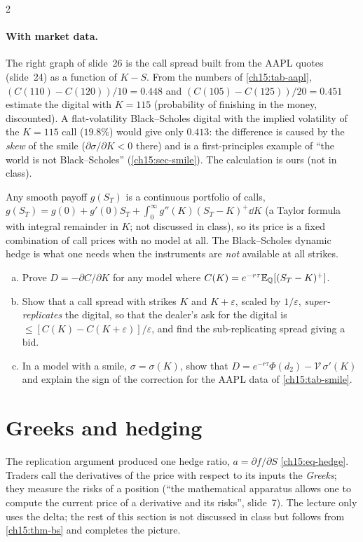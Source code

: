 \begin{paracol}{2}
\paragraph{With market data.} The right graph of slide~26 is the call spread built from the AAPL quotes (slide~24) as a function of $K-S$. From the numbers of \cref{ch15:tab-aapl}, $(C(110)-C(120))/10=0.448$
and $(C(105)-C(125))/20=0.451$ estimate the digital with $K=115$ (probability of finishing in the money, discounted). A flat-volatility Black--Scholes digital with the implied volatility of the $K=115$ call ($19.8\%$) would give only $0.413$: the
difference is caused by the \emph{skew} of the smile ($\partial\sigma/\partial K<0$ there) and is a first-principles example of ``the world is not Black--Scholes'' (\cref{ch15:sec-smile}). The calculation is ours (not in class).

\begin{intuition}
Any smooth payoff $g(S_T)$ is a continuous portfolio of calls, $g(S_T)=g(0)+g'(0)S_T+\int_0^\infty g''(K)(S_T-K)^+\dd K$ (a Taylor formula with integral remainder in $K$; not discussed in class), so its price
is a fixed combination of call prices with no model at all. The Black--Scholes dynamic hedge is what one needs when the instruments are \emph{not} available at all strikes.
\end{intuition}

\begin{exercise}\label{ch15:ex-digital}
\leavevmode
\begin{enumerate}[(a)]
  \item Prove $D=-\partial C/\partial K$ for any model where $C(K)=e^{-r\tau}\mathbb{E}_{\mathbb{Q}}[(S_T-K)^+]$.
  \item Show that a call spread with strikes $K$ and $K+\varepsilon$, scaled by $1/\varepsilon$, \emph{super-replicates} the digital,
      so that the dealer's ask for the digital is $\le[C(K)-C(K+\varepsilon)]/\varepsilon$, and find the sub-replicating spread giving a bid.
  \item In a model with a smile, $\sigma=\sigma(K)$, show that $D=e^{-r\tau}\Phi(d_2)-\mathcal V\,\sigma'(K)$ and explain the sign
      of the correction for the AAPL data of \cref{ch15:tab-smile}.
\end{enumerate}
\end{exercise}


\section{Greeks and hedging}\label{ch15:sec-greeks}
The replication argument produced one hedge ratio, $a=\partial f/\partial S$ \eqref{ch15:eq-hedge}. Traders call the derivatives of the price with respect to its inputs the \emph{Greeks}; they measure
the risks of a position (``the mathematical apparatus allows one to compute the current price of a derivative and its risks'', slide~7). The lecture only uses the delta; the rest of this section is not
discussed in class but follows from \cref{ch15:thm-bs} and completes the picture.


\end{paracol}
